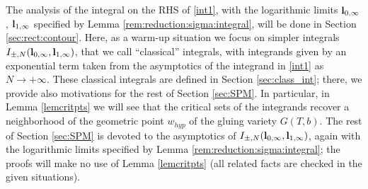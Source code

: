 \documentclass[11pt]{amsart}
\newcommand{\bl}{{\bf l}}
\begin{document}
{The analysis of the integral on the RHS of \eqref{int1},  with the logarithmic limits $\bl_{0,\infty}$, $\bl_{1,\infty}$ specified by Lemma \ref{rem:reduction:sigma:integral}, will be done in Section \ref{sec:rect:contour}. Here, as a warm-up situation we focus on simpler integrals $I_{\pm,N}(\bl_{0,\infty},\bl_{1,\infty})$, that we call ``classical'' integrals, with integrands given by an exponential term taken from the asymptotics of the integrand in \eqref{int1} as $N\to +\infty$. These classical integrals are defined in Section \ref{sec:class_int}; there, we provide also motivations for the rest of Section \ref{sec:SPM}. In particular, in Lemma \ref{lemcritpts} we will see that the critical sets of the integrands recover a neighborhood of the geometric point $w_{hyp}$ of the gluing variety $G(T,b)$. The rest of Section \ref{sec:SPM} is devoted to the asymptotics of $I_{\pm,N}(\bl_{0,\infty},\bl_{1,\infty})$, again with the logarithmic limits specified by Lemma \ref{rem:reduction:sigma:integral}; the proofs will make no use of Lemma \ref{lemcritpts} (all related facts are checked in the given situations).

}
\end{document}
